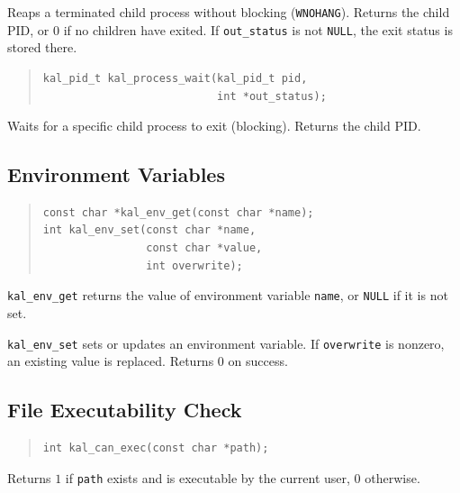 \documentclass[11pt,twoside]{article}
\begin{document}
Reaps a terminated child process without blocking ({\tt WNOHANG}).
Returns the child PID, or $0$ if no children have exited.  If
{\tt out\_status} is not {\tt NULL}, the exit status is stored there.

\begin{quote}
\begin{verbatim}
kal_pid_t kal_process_wait(kal_pid_t pid,
                           int *out_status);
\end{verbatim}
\end{quote}

Waits for a specific child process to exit (blocking).  Returns the
child PID.

\subsection{Environment Variables}

\begin{quote}
\begin{verbatim}
const char *kal_env_get(const char *name);
int kal_env_set(const char *name,
                const char *value,
                int overwrite);
\end{verbatim}
\end{quote}

{\tt kal\_env\_get} returns the value of environment variable
{\tt name}, or {\tt NULL} if it is not set.

{\tt kal\_env\_set} sets or updates an environment variable.  If
{\tt overwrite} is nonzero, an existing value is replaced.  Returns
$0$ on success.

\subsection{File Executability Check}

\begin{quote}
\begin{verbatim}
int kal_can_exec(const char *path);
\end{verbatim}
\end{quote}

Returns $1$ if {\tt path} exists and is executable by the current
user, $0$ otherwise.
\end{document}
